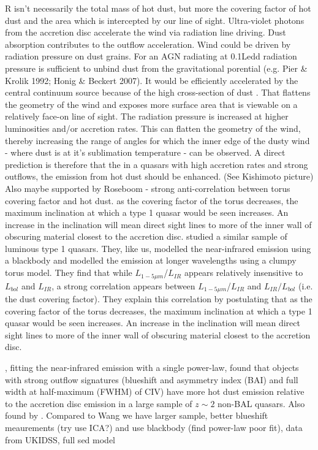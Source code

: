 R isn't necessarily the total mass of hot dust, but more the covering factor of hot dust and the area which is intercepted by our line of sight. 
Ultra-violet photons from the accretion disc accelerate the wind via radiation line driving.
Dust absorption contributes to the outflow acceleration. 
Wind could be driven by radiation pressure on dust grains. 
For an AGN radiating at 0.1Ledd radiation pressure is sufficient to unbind dust from the gravitational porential (e.g. Pier \& Krolik 1992; Honig \& Beckert 2007). 
It would be efficiently accelerated by the central continuum source because of the high cross-section of dust \citep[e.g.][]{fabian12}.  
That flattens the geometry of the wind and exposes more surface area that is viewable on a relatively face-on line of sight.  
The radiation pressure is increased at higher luminosities and/or accretion rates.
This can flatten the geometry of the wind, thereby increasing the range of angles for which the inner edge of the dusty wind - where dust is at it's sublimation temperature - can be observed. 
A direct prediction is therefore that the in a quasars with high accretion rates and strong outflows, the emission from hot dust should be enhanced. 
(See Kishimoto picture)
Also maybe supported by Roseboom - strong anti-correlation between torus covering factor and hot dust. as the covering factor of the torus decreases, the maximum inclination at which a type 1 quasar would be seen increases. 
An increase in the inclination will mean direct sight lines to more of the inner wall of obscuring material closest to the accretion disc. 
\citet{roseboom13} studied a similar sample of luminous type 1 quasars. 
They, like us, modelled the near-infrared emission using a blackbody and modelled the emission at longer wavelengths using a clumpy torus model. 
They find that while $L_{1-5\mu m}$/$L_{IR}$ appears relatively insensitive to $L_{bol}$ and $L_{IR}$, a strong correlation appears between $L_{1-5\mu m}$/$L_{IR}$ and $L_{IR}/L_{bol}$ (i.e. the dust covering factor). 
They explain this correlation by postulating that as the covering factor of the torus decreases, the maximum inclination at which a type 1 quasar would be seen increases. 
An increase in the inclination will mean direct sight lines to more of the inner wall of obscuring material closest to the accretion disc.

\citet{wang13}, fitting the near-infrared emission with a single power-law, found that objects with strong outflow signatures (blueshift and asymmetry index (BAI) and full width at half-maximum (FWHM) of CIV) have more hot dust emission relative to the accretion disc emission in a large sample of $z\sim2$ non-BAL quasars. 
Also found by \citet{shen14}. 
Compared to Wang we have larger sample, better blueshift meaurements (try use ICA?) and use blackbody (find power-law poor fit), data from UKIDSS, full sed model

